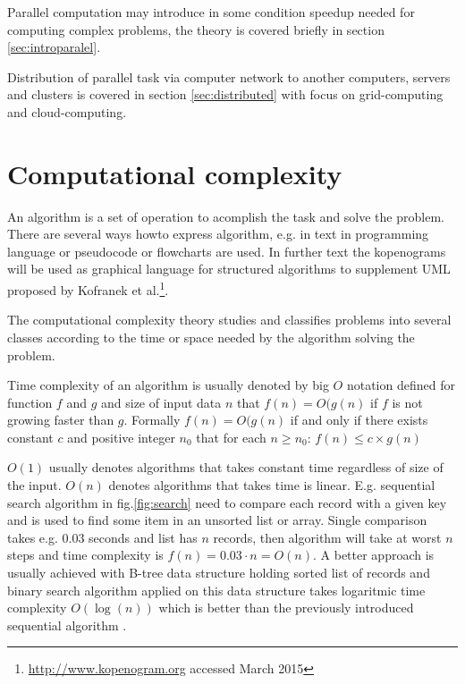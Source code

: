 Parallel computation may introduce in some condition speedup needed for computing complex problems, the theory is covered briefly in section \ref{sec:introparalel}.

Distribution of parallel task via computer network to another computers, servers and clusters is covered in section \ref{sec:distributed} with focus on grid-computing and cloud-computing.

\section{Computational complexity}
\label{sec:introcomplexity}

An algorithm is a set of operation to acomplish the task and solve the problem. There are several ways howto express algorithm, e.g. in text in programming language or pseudocode or flowcharts are used. In further text the kopenograms will be used as graphical language for structured algorithms to supplement UML proposed by Kofranek et al.\cite{Kofranek2012}\footnote{\url{http://www.kopenogram.org} accessed March 2015}.

The computational complexity theory studies and classifies problems into several classes according to the time or space needed by the algorithm solving the problem.

Time complexity of an algorithm is usually denoted by big $O$ notation defined for function $f$ and $g$ and size of input data $n$ that 
$f(n)=O(g(n)$ if $f$ is not growing faster than $g$. Formally $f(n)=O(g(n)$ if and only if there exists constant $c$ and positive integer $n_0$ that for each $n\geq n_0$: $f(n) \leq c \times g(n)$

$O(1)$ usually denotes algorithms that takes constant time regardless of size of the input. $O(n)$ denotes algorithms that takes time is linear. E.g. sequential search algorithm in fig.\ref{fig:search} need to compare each record with a given key and is used to find some item in an unsorted list or array. Single comparison takes e.g. $0.03$ seconds and list has $n$ records, then algorithm will take at worst $n$ steps and time complexity is $f(n) = 0.03 \cdot n = O(n)$. A better approach is usually achieved with B-tree data structure holding sorted list of records and binary search algorithm applied on this data structure takes logaritmic time complexity $O(\log(n))$ which is better than the previously introduced sequential algorithm \cite{Bayer1972Org,Bayer1972Sym}.

